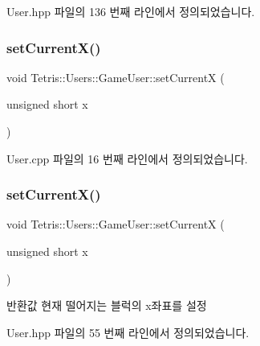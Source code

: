User.\+hpp 파일의 136 번째 라인에서 정의되었습니다.

\mbox{\label{class_tetris_1_1_users_1_1_game_user_a2957358b1a6298f06c6c2e10cb89f623}} 
\subsubsection{\texorpdfstring{set\+Current\+X()}{setCurrentX()}\hspace{0.1cm}{\footnotesize\ttfamily [1/2]}}
{\footnotesize\ttfamily void Tetris\+::\+Users\+::\+Game\+User\+::set\+CurrentX (\begin{DoxyParamCaption}\item[{unsigned short}]{x }\end{DoxyParamCaption})}



User.\+cpp 파일의 16 번째 라인에서 정의되었습니다.

\mbox{\label{class_tetris_1_1_users_1_1_game_user_a2957358b1a6298f06c6c2e10cb89f623}} 
\subsubsection{\texorpdfstring{set\+Current\+X()}{setCurrentX()}\hspace{0.1cm}{\footnotesize\ttfamily [2/2]}}
{\footnotesize\ttfamily void Tetris\+::\+Users\+::\+Game\+User\+::set\+CurrentX (\begin{DoxyParamCaption}\item[{unsigned short}]{x }\end{DoxyParamCaption})\hspace{0.3cm}{\ttfamily [inline]}}

\begin{DoxyReturn}{반환값}
현재 떨어지는 블럭의 x좌표를 설정 
\end{DoxyReturn}


User.\+hpp 파일의 55 번째 라인에서 정의되었습니다.


